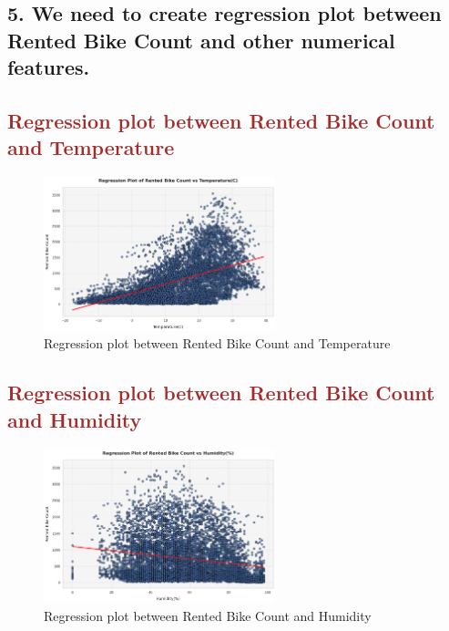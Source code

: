\documentclass[12pt, letterpaper]{article}
\begin{document}
\subsection*{5. We need to create regression plot between Rented Bike Count and other numerical features.}

\newpage

\subsection*{\textcolor{brown}{Regression plot between Rented Bike Count and Temperature}}

\begin{figure}[h]
  \centering
  \includegraphics[width=0.6\textwidth]{regression1.png}
  \caption{Regression plot between Rented Bike Count and Temperature}
\end{figure}

\subsection*{\textcolor{brown}{Regression plot between Rented Bike Count and Humidity}}

\begin{figure}[h]
  \centering
  \includegraphics[width=0.6\textwidth]{regression2.png}
  \caption{Regression plot between Rented Bike Count and Humidity}
\end{figure}

\newpage
\end{document}
